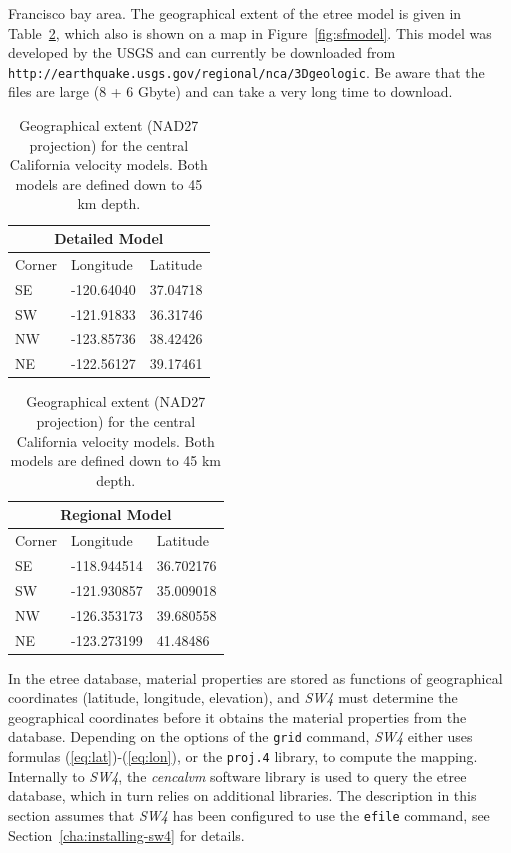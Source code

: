 \documentclass[11pt]{report}
\begin{document}
Francisco bay area. The geographical extent of the etree model is given in Table~\ref{tab:sfdata},
which also is shown on a map in Figure~\ref{fig:sfmodel}. This model was developed by the USGS and
can currently be downloaded from {\tt http://earthquake.usgs.gov/regional/nca/3Dgeologic}. Be aware
that the files are large (8 + 6 Gbyte) and can take a very long time to download.
\begin{table}
\begin{center}
\begin{tabular}{|l|l|l|} \hline
\multicolumn{3}{|c|}{\bf Detailed Model} \\ \hline
Corner & Longitude & Latitude \\ \hline
SE & -120.64040 & 37.04718 \\ \hline
SW & -121.91833 & 36.31746 \\ \hline
NW & -123.85736 & 38.42426 \\ \hline
NE & -122.56127 & 39.17461 \\ \hline
\end{tabular} \hspace{5 mm}
\begin{tabular}{|l|l|l|} \hline
\multicolumn{3}{|c|}{\bf Regional Model} \\ \hline
Corner & Longitude & Latitude \\ \hline
SE & -118.944514 & 36.702176 \\ \hline
SW & -121.930857 & 35.009018 \\ \hline
NW & -126.353173 & 39.680558 \\ \hline
NE & -123.273199 & 41.48486\\ \hline
\end{tabular}
\caption{Geographical extent (NAD27 projection) for the central California velocity models. Both
  models are defined down to 45 km depth.}\label{tab:sfdata}
\end{center}
\end{table}%

In the etree database, material properties are stored as functions of geographical coordinates
(latitude, longitude, elevation), and \emph{SW4} must determine the geographical coordinates before it
obtains the material properties from the database. Depending on the options of the \verb+grid+
command, \emph{SW4} either uses formulas (\ref{eq:lat})-(\ref{eq:lon}), or the \verb+proj.4+
library, to compute the mapping. Internally to \emph{SW4}, the \emph{cencalvm} software library is
used to query the etree database, which in turn relies on additional libraries. The description in
this section assumes that \emph{SW4} has been configured to use the \verb+efile+ command, see
Section~\ref{cha:installing-sw4} for details.
\end{document}
